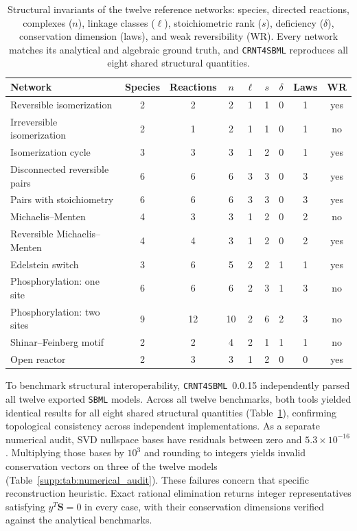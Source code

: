 \documentclass[10pt,a4paper,fleqn]{article}
\begin{document}
\begin{table}[!htbp]
\centering
\caption{Structural invariants of the twelve reference networks: species, directed reactions, complexes ($n$), linkage classes ($\ell$), stoichiometric rank ($s$), deficiency ($\delta$), conservation dimension (laws), and weak reversibility (WR). Every network matches its analytical and algebraic ground truth, and \texttt{CRNT4SBML} reproduces all eight shared structural quantities.}
\label{tab:reference}
\footnotesize
\begin{tabular*}{\linewidth}{@{\extracolsep{\fill}}l cccccccc@{}}
\toprule
Network & Species & Reactions & $n$ & $\ell$ & $s$ & $\delta$ & Laws & WR \\
\midrule
Reversible isomerization & 2 & 2 & 2 & 1 & 1 & 0 & 1 & yes \\
Irreversible isomerization & 2 & 1 & 2 & 1 & 1 & 0 & 1 & no \\
Isomerization cycle & 3 & 3 & 3 & 1 & 2 & 0 & 1 & yes \\
Disconnected reversible pairs & 6 & 6 & 6 & 3 & 3 & 0 & 3 & yes \\
Pairs with stoichiometry & 6 & 6 & 6 & 3 & 3 & 0 & 3 & yes \\
Michaelis--Menten & 4 & 3 & 3 & 1 & 2 & 0 & 2 & no \\
Reversible Michaelis--Menten & 4 & 4 & 3 & 1 & 2 & 0 & 2 & yes \\
Edelstein switch & 3 & 6 & 5 & 2 & 2 & 1 & 1 & yes \\
Phosphorylation: one site & 6 & 6 & 6 & 2 & 3 & 1 & 3 & no \\
Phosphorylation: two sites & 9 & 12 & 10 & 2 & 6 & 2 & 3 & no \\
Shinar--Feinberg motif & 2 & 2 & 4 & 2 & 1 & 1 & 1 & no \\
Open reactor & 2 & 3 & 3 & 1 & 2 & 0 & 0 & yes \\
\bottomrule
\end{tabular*}
\end{table}

To benchmark structural interoperability, \texttt{CRNT4SBML}~0.0.15 independently parsed all twelve exported \texttt{SBML} models. Across all twelve benchmarks, both tools yielded identical results for all eight shared structural quantities (Table~\ref{tab:reference}), confirming topological consistency across independent implementations. As a separate numerical audit, SVD nullspace bases have residuals between zero and $5.3\times10^{-16}$. Multiplying those bases by $10^3$ and rounding to integers yields invalid conservation vectors on three of the twelve models (Table~\ref{supp:tab:numerical_audit}). These failures concern that specific reconstruction heuristic. Exact rational elimination returns integer representatives satisfying $y^T\mathbf S=0$ in every case, with their conservation dimensions verified against the analytical benchmarks.
\end{document}

